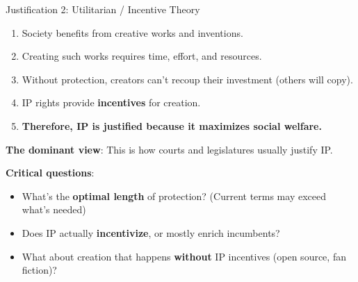 \documentclass[aspectratio=169]{beamer}
\begin{document}
\begin{frame}{Justification 2: Utilitarian / Incentive Theory}
\begin{argumentbox}
\begin{enumerate}
    \item Society benefits from creative works and inventions.
    \item Creating such works requires time, effort, and resources.
    \item Without protection, creators can't recoup their investment (others will copy).
    \item IP rights provide \textbf{incentives} for creation.
    \item[\textbf{C.}] \textbf{Therefore, IP is justified because it maximizes social welfare.}
\end{enumerate}
\end{argumentbox}

\vspace{0.2cm}
\textbf{The dominant view}: This is how courts and legislatures usually justify IP.

\vspace{0.2cm}
\textbf{Critical questions}:
\begin{itemize}
    \item What's the \textbf{optimal length} of protection? (Current terms may exceed what's needed)
    \item Does IP actually \textbf{incentivize}, or mostly enrich incumbents?
    \item What about creation that happens \textbf{without} IP incentives (open source, fan fiction)?
\end{itemize}
\end{frame}
\end{document}
